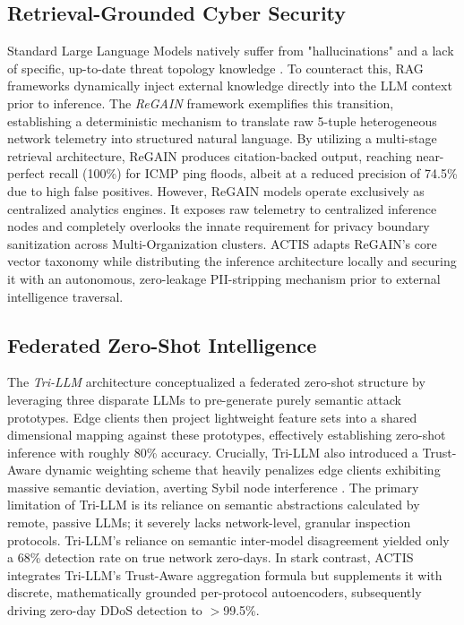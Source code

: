 \documentclass[conference]{IEEEtran}
\begin{document}
\subsection{Retrieval-Grounded Cyber Security}
Standard Large Language Models natively suffer from "hallucinations" and a lack of specific, up-to-date threat topology knowledge \cite{ref5Wu}. To counteract this, RAG frameworks dynamically inject external knowledge directly into the LLM context prior to inference. The \textit{ReGAIN} framework \cite{ref2ReGAIN} exemplifies this transition, establishing a deterministic mechanism to translate raw 5-tuple heterogeneous network telemetry into structured natural language. By utilizing a multi-stage retrieval architecture, ReGAIN produces citation-backed output, reaching near-perfect recall (100\%) for ICMP ping floods, albeit at a reduced precision of 74.5\% due to high false positives. However, ReGAIN models operate exclusively as centralized analytics engines. It exposes raw telemetry to centralized inference nodes and completely overlooks the innate requirement for privacy boundary sanitization across Multi-Organization clusters. ACTIS adapts ReGAIN's core vector taxonomy while distributing the inference architecture locally and securing it with an autonomous, zero-leakage PII-stripping mechanism prior to external intelligence traversal.

\subsection{Federated Zero-Shot Intelligence}
The \textit{Tri-LLM} architecture \cite{ref1TriLLM} conceptualized a federated zero-shot structure by leveraging three disparate LLMs to pre-generate purely semantic attack prototypes. Edge clients then project lightweight feature sets into a shared dimensional mapping against these prototypes, effectively establishing zero-shot inference with roughly 80\% accuracy. Crucially, Tri-LLM also introduced a Trust-Aware dynamic weighting scheme that heavily penalizes edge clients exhibiting massive semantic deviation, averting Sybil node interference \cite{ref33Fung}. The primary limitation of Tri-LLM is its reliance on semantic abstractions calculated by remote, passive LLMs; it severely lacks network-level, granular inspection protocols. Tri-LLM's reliance on semantic inter-model disagreement yielded only a 68\% detection rate on true network zero-days. In stark contrast, ACTIS integrates Tri-LLM’s Trust-Aware aggregation formula but supplements it with discrete, mathematically grounded per-protocol autoencoders, subsequently driving zero-day DDoS detection to $>$99.5\%.
\end{document}
